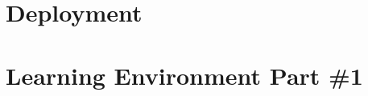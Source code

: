 \documentclass[12pt, a4paper, oneside]{book}
\begin{document}
\paragraph{} 

\chapter{Deployment}
\label{deployment}
\paragraph{} 



\chapter{Learning Environment Part \#1}
\label{lab1}
\paragraph{} 











\backmatter




\end{document}
